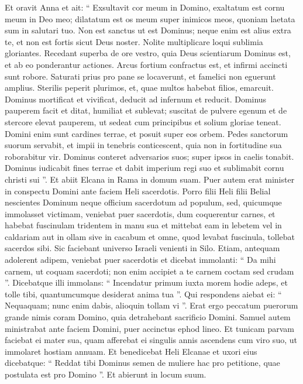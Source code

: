 \begin{biblechapter}
\begin{biblechapter}
\verse Et oravit Anna et ait:
 “ Exsultavit cor meum in Domino,
 exaltatum est cornu meum in Deo meo;
 dilatatum est os meum super inimicos meos,
 quoniam laetata sum in salutari tuo.
 \verse Non est sanctus ut est Dominus;
 neque enim est alius extra te,
 et non est fortis sicut Deus noster.
 \verse Nolite multiplicare loqui sublimia gloriantes.
 Recedant superba de ore vestro,
 quia Deus scientiarum Dominus est, et ab eo ponderantur actiones.
 \verse Arcus fortium confractus est,
 et infirmi accincti sunt robore.
 \verse Saturati prius pro pane se locaverunt,
 et famelici non eguerunt amplius.
 Sterilis peperit plurimos,
 et, quae multos habebat filios, emarcuit.
 \verse Dominus mortificat et vivificat,
 deducit ad infernum et reducit.
 \verse Dominus pauperem facit et ditat,
 humiliat et sublevat;
 \verse suscitat de pulvere egenum
 et de stercore elevat pauperem,
 ut sedeat cum principibus
 et solium gloriae teneat.
 Domini enim sunt cardines terrae, et posuit super eos orbem.
 \verse Pedes sanctorum suorum servabit,
 et impii in tenebris conticescent,
 quia non in fortitudine sua roborabitur vir.
 \verse Dominus conteret adversarios suos;
 super ipsos in caelis tonabit.
 Dominus iudicabit fines terrae
 et dabit imperium regi suo
 et sublimabit cornu christi sui ”.
 \verse Et abiit Elcana in Rama in domum suam. Puer autem erat minister in conspectu Domini ante faciem Heli sacerdotis.
 \verse Porro filii Heli filii Belial nescientes Dominum 
\verse neque officium sacerdotum ad populum, sed, quicumque immolasset victimam, veniebat puer sacerdotis, dum coquerentur carnes, et habebat fuscinulam tridentem in manu sua 
 \verse et mittebat eam in lebetem vel in caldariam aut in ollam sive in cacabum et omne, quod levabat fuscinula, tollebat sacerdos sibi. Sic faciebant universo Israeli venienti in Silo. 
\verse Etiam, antequam adolerent adipem, veniebat puer sacerdotis et dicebat immolanti: “ Da mihi carnem, ut coquam sacerdoti; non enim accipiet a te carnem coctam sed crudam ”. 
\verse Dicebatque illi immolans: “ Incendatur primum iuxta morem hodie adeps, et tolle tibi, quantumcumque desiderat anima tua ”. Qui respondens aiebat ei: “ Nequaquam; nunc enim dabis, alioquin tollam vi ”. 
\verse Erat ergo peccatum puerorum grande nimis coram Domino, quia detrahebant sacrificio Domini.
 \verse Samuel autem ministrabat ante faciem Domini, puer accinctus ephod lineo. 
 \verse Et tunicam parvam faciebat ei mater sua, quam afferebat ei singulis annis ascendens cum viro suo, ut immolaret hostiam annuam. 
\verse Et benedicebat Heli Elcanae et uxori eius dicebatque: “ Reddat tibi Dominus semen de muliere hac pro petitione, quae postulata est pro Domino ”. Et abierunt in locum suum. 

\end{biblechapter}
\end{biblechapter}

